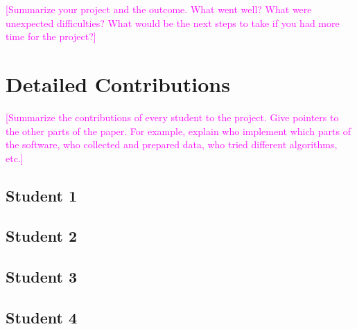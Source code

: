 \documentclass[sigconf,10pt]{acmart}
\newcommand{\todo}[1]{\textcolor{magenta}{[#1]}}
\begin{document}
\todo{Summarize your project and the outcome. What went well? What were unexpected difficulties? What would be the next steps to take if you had more time for the project?}

\blindtext

\blindtext


\section{Detailed Contributions}

\todo{Summarize the contributions of every student to the project. Give pointers to the other parts of the paper. For example, explain who implement which parts of the software, who collected and prepared data, who tried different algorithms, etc.}

\subsection{Student 1}

\blindtext

\subsection{Student 2}

\blindtext

\subsection{Student 3}

\blindtext

\subsection{Student 4}

\blindtext
\end{document}
